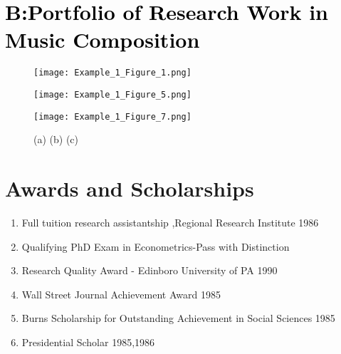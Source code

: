 \documentclass{ResumeDesignFormat2}
\begin{document}
\section{\textcolor{black}{B:Portfolio of Research Work in Music Composition}}

\begin{figure}[h]
\centering
\begin{minipage}[b]{0.3\linewidth}
\texttt{[image: Example\_1\_Figure\_1.png]}
\end{minipage}\hfill
\begin{minipage}[b]{0.3\linewidth}
\texttt{[image: Example\_1\_Figure\_5.png]}
\end{minipage}\hfill	
\begin{minipage}[b]{0.3\linewidth}
\texttt{[image: Example\_1\_Figure\_7.png]}
\end{minipage}\hfill
\caption{(a) (b) (c) }
\label{fig:Figure1}
\end{figure} 

\newpage
\section{Awards and Scholarships}
\begin{enumerate} \itemsep -2pt
\item Full tuition research assistantship ,Regional Research Institute 1986  \\
\item Qualifying PhD Exam in Econometrics-Pass with Distinction\\
\item Research Quality Award - Edinboro University of PA 1990\\
\item Wall Street Journal Achievement Award 1985\\
\item Burns Scholarship for Outstanding Achievement in Social Sciences 1985\\
\item Presidential Scholar 1985,1986\\
\end{enumerate}
\end{document}
